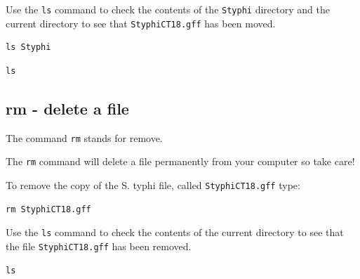 \documentclass[11pt]{article}
\makeatletter
\newcommand{\boxspacing}{\kern\kvtcb@left@rule\kern\kvtcb@boxsep}
\newcommand{\prompt}[4]{
       \ttfamily\llap{{\color{#2}\LARGE\faKeyboardO\hspace{3pt}#4}}\vspace{-\baselineskip}
    }
\makeatother
\begin{document}
    Use the \texttt{ls} command to check the contents of the \texttt{Styphi}
directory and the current directory to see that \texttt{StyphiCT18.gff}
has been moved.

    \begin{tcolorbox}[breakable, size=fbox, boxrule=1pt, pad at break*=1mm,colback=cellbackground, colframe=cellborder]
\prompt{In}{incolor}{ }{\boxspacing}
\begin{Verbatim}[commandchars=\\\{\}]
ls Styphi
\end{Verbatim}
\end{tcolorbox}

    \begin{tcolorbox}[breakable, size=fbox, boxrule=1pt, pad at break*=1mm,colback=cellbackground, colframe=cellborder]
\prompt{In}{incolor}{ }{\boxspacing}
\begin{Verbatim}[commandchars=\\\{\}]
ls
\end{Verbatim}
\end{tcolorbox}

    \hypertarget{rm---delete-a-file}{%
\subsection{rm - delete a file}\label{rm---delete-a-file}}

The command \texttt{rm} stands for remove.

The \texttt{rm} command will delete a file permanently from your
computer so take care!

To remove the copy of the S. typhi file, called \texttt{StyphiCT18.gff}
type:

    \begin{tcolorbox}[breakable, size=fbox, boxrule=1pt, pad at break*=1mm,colback=cellbackground, colframe=cellborder]
\prompt{In}{incolor}{ }{\boxspacing}
\begin{Verbatim}[commandchars=\\\{\}]
rm StyphiCT18.gff
\end{Verbatim}
\end{tcolorbox}

    Use the \texttt{ls} command to check the contents of the current
directory to see that the file \texttt{StyphiCT18.gff} has been removed.

    \begin{tcolorbox}[breakable, size=fbox, boxrule=1pt, pad at break*=1mm,colback=cellbackground, colframe=cellborder]
\prompt{In}{incolor}{ }{\boxspacing}
\begin{Verbatim}[commandchars=\\\{\}]
ls
\end{Verbatim}
\end{tcolorbox}
\end{document}
